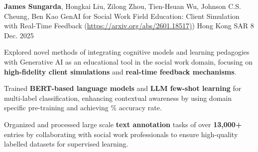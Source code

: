 
\begin{cventries}
  \cventry
    {\textbf{James Sungarda}, Hongkai Liu, Zilong Zhou, Tien-Hsuan Wu, Johnson C.S. Cheung, Ben Kao} 
    {GenAI for Social Work Field Education: Client Simulation with Real-Time
Feedback (\url{https://arxiv.org/abs/2601.18517)})} 
    {Hong Kong SAR} 
    {8 Dec. 2025} 
    {
      \begin{cvitems} %
        \item {Explored novel methods of integrating cognitive models and learning pedagogies with Generative AI as an educational tool in
the social work domain, focusing on \textbf{high-fidelity client simulations} and \textbf{real-time feedback mechanisms}.}
        \item {Trained \textbf{BERT-based language models} and \textbf{LLM few-shot learning} for multi-label classification, enhancing contextual awareness by using domain specific pre-training and achieving \% accuracy rate.}
        \item {Organized and processed large scale \textbf{text annotation} tasks of over \textbf{13,000+} entries by collaborating with social work professionals to ensure high-quality labelled datasets for supervised learning.}
      \end{cvitems}
    }
\end{cventries}
